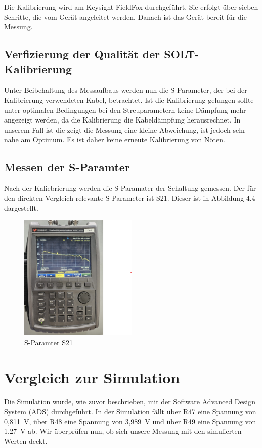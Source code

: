 Die Kalibrierung wird am Keysight FieldFox durchgeführt. Sie erfolgt über sieben Schritte, die vom Gerät angeleitet werden. Danach ist das Gerät bereit für die Messung.
\subsection{Verfizierung der Qualität der SOLT-Kalibrierung}
Unter Beibehaltung des Messaufbaus werden nun die S-Parameter, der bei der Kalibrierung verwendeten Kabel, betrachtet. Ist die Kalibrierung gelungen sollte unter optimalen Bedingungen bei den Streuparametern keine Dämpfung mehr angezeigt werden, da die Kalibrierung die Kabeldämpfung herausrechnet. In unserem Fall ist die zeigt die Messung eine kleine Abweichung, ist jedoch sehr nahe am Optimum. Es ist daher keine erneute Kalibrierung von Nöten.

\subsection{Messen der S-Paramter}
Nach der Kaliebrierung werden die S-Paramater der Schaltung gemessen. Der für den direkten Vergleich relevante S-Parameter ist S21. Dieser
ist in Abbildung 4.4 dargestellt.
\begin{figure}[h]
    \centering
    \includegraphics[width=0.5\textwidth]{Pictures/SParameterrichtig.png}
    \caption{S-Paramter S21}
\end{figure}
\clearpage




\section{Vergleich zur Simulation}
Die Simulation wurde, wie zuvor beschrieben, mit der Software Advanced Design System (ADS) durchgeführt. In der Simulation fällt über R47 eine Spannung von 0,811~V, über R48 eine Spannung von 3,989~V und über R49 eine Spannung von 1,27~V ab. Wir überprüfen nun, ob sich unsere Messung mit den simulierten Werten deckt.

